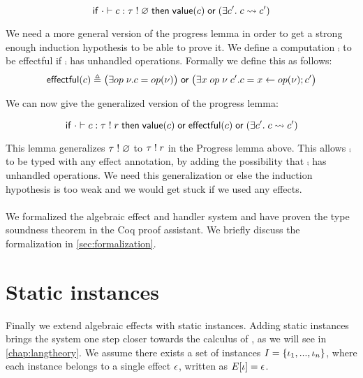 {\begin{lemma}[Progress]
\[
	\mathsf{if}\;
		\cdot \vdash c : \tau \; ! \; \varnothing
	\;\mathsf{then}\;
		\mathsf{value}(c)
		\;\mathsf{or}\;
		(\exists c'.\; c \rightsquigarrow c')
\]
\end{lemma}

We need a more general version of the progress lemma in order to get a strong enough induction hypothesis to be able to prove it.
We define a computation $\comp$ to be effectful if $\comp$ has unhandled operations.
Formally we define this as follows:
	\[ \mathsf{effectful}(c) \triangleq \big(\exists op \; \nu. c = op(\nu)\big) \;\mathsf{or}\; \big(\exists x \; op \; \nu \; c'. c = x \leftarrow op(\nu) ; c'\big) \]

We can now give the generalized version of the progress lemma:

\begin{lemma}
\[
	\mathsf{if}\;
		\cdot \vdash c : \tau \; ! \; r
	\;\mathsf{then}\;
		\mathsf{value}(c)
		\;\mathsf{or}\;
		\mathsf{effectful}(c)
		\;\mathsf{or}\;
		(\exists c'.\; c \rightsquigarrow c')
\]
\end{lemma}

This lemma generalizes $\tau \; ! \; \varnothing$ to $\tau \; ! \; r$ in the Progress lemma above.
This allows $\comp$ to be typed with any effect annotation, by adding the possibility that $\comp$ has unhandled operations.
We need this generalization or else the induction hypothesis is too weak and we would get stuck if we used any effects.
\\\\
We formalized the algebraic effect and handler system and have proven the type soundness theorem in the Coq proof assistant.
We briefly discuss the formalization in \cref{sec:formalization}.

\section{Static instances} \label{sec:theory-staticinst}

Finally we extend algebraic effects with static instances.
Adding static instances brings the system one step closer towards the calculus of \lang{}, as we will see in \cref{chap:langtheory}.
We assume there exists a set of instances $I = \{ \iota_1, ..., \iota_n \}$, where each instance belongs to a single effect $\epsilon$, written as $E[\iota] = \epsilon$.

}
